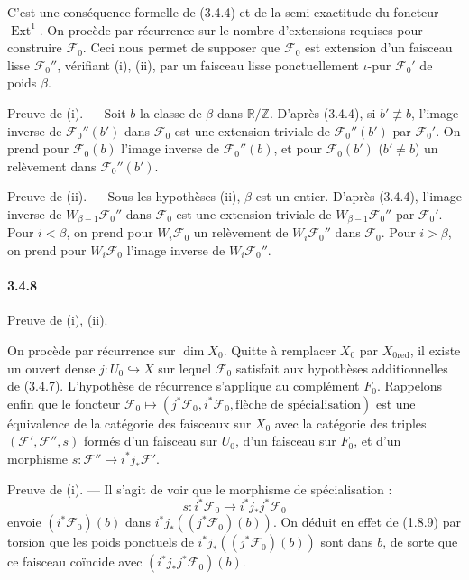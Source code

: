 \documentclass[12pt,a4paper]{article}
\theoremstyle{plain}
\theoremstyle{definition}
\theoremstyle{remark}
\DeclareMathOperator{\Ext}{Ext}
\newcommand{\RR}{{\mathbb{R}}}
\newcommand{\ZZ}{{\mathbb{Z}}}
\begin{document}
C'est une cons\'equence formelle de (3.4.4) et de la semi-exactitude du foncteur $\Ext^1$. On proc\`ede par r\'ecurrence sur le nombre d'extensions requises pour construire $\mathscr{F}_0$. Ceci nous permet de supposer que $\mathscr{F}_0$ est extension d'un faisceau lisse $\mathscr{F}_0''$, v\'erifiant (i), (ii), par un faisceau lisse ponctuellement $\iota$-pur $\mathscr{F}_0'$ de poids $\beta$.

Preuve de (i). --- Soit $b$ la classe de $\beta$ dans $\RR/\ZZ$. D'apr\`es (3.4.4), si $b' \not\equiv b$, l'image inverse de $\mathscr{F}_0''(b')$ dans $\mathscr{F}_0$ est une extension triviale de $\mathscr{F}_0''(b')$ par $\mathscr{F}_0'$. On prend pour $\mathscr{F}_0(b)$ l'image inverse de $\mathscr{F}_0''(b)$, et pour $\mathscr{F}_0(b')$ ($b' \neq b$) un rel\`evement dans $\mathscr{F}_0''(b')$.

Preuve de (ii). --- Sous les hypoth\`eses (ii), $\beta$ est un entier. D'apr\`es (3.4.4), l'image inverse de $W_{\beta-1}\mathscr{F}_0''$ dans $\mathscr{F}_0$ est une extension triviale de $W_{\beta-1}\mathscr{F}_0''$ par $\mathscr{F}_0'$. Pour $i < \beta$, on prend pour $W_i\mathscr{F}_0$ un rel\`evement de $W_i\mathscr{F}_0''$ dans $\mathscr{F}_0$. Pour $i > \beta$, on prend pour $W_i\mathscr{F}_0$ l'image inverse de $W_i\mathscr{F}_0''$.

\paragraph{3.4.8}
Preuve de (i), (ii).


On proc\`ede par r\'ecurrence sur $\dim X_0$. Quitte \`a remplacer $X_0$ par $X_{0\text{red}}$, il existe un ouvert dense $j : U_0 \hookrightarrow X$ sur lequel $\mathscr{F}_0$ satisfait aux hypoth\`eses additionnelles de (3.4.7). L'hypoth\`ese de r\'ecurrence s'applique au compl\'ement $F_0$. Rappelons enfin que le foncteur $\mathscr{F}_0 \mapsto (j^*\mathscr{F}_0, i^*\mathscr{F}_0, \text{fl\`eche de sp\'ecialisation})$ est une \'equivalence de la cat\'egorie des faisceaux sur $X_0$ avec la cat\'egorie des triples $(\mathscr{F}', \mathscr{F}'', s)$ form\'es d'un faisceau sur $U_0$, d'un faisceau sur $F_0$, et d'un morphisme $s : \mathscr{F}'' \to i^* j_* \mathscr{F}'$.

Preuve de (i). --- Il s'agit de voir que le morphisme de sp\'ecialisation :
\[ s : i^*\mathscr{F}_0 \to i^* j_* j^* \mathscr{F}_0 \]
envoie $(i^*\mathscr{F}_0)(b)$ dans $i^* j_* ((j^*\mathscr{F}_0)(b))$. On d\'eduit en effet de (1.8.9) par torsion que les poids ponctuels de $i^* j_* ((j^*\mathscr{F}_0)(b))$ sont dans $b$, de sorte que ce faisceau co\"incide avec $(i^* j_* j^* \mathscr{F}_0)(b)$.
\end{document}
